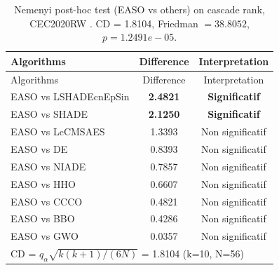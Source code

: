\begin{center}
\small
\renewcommand{\arraystretch}{1.25}
\begin{longtable}{lcc}
\caption{Nemenyi post-hoc test (EASO vs others) on cascade rank, CEC2020RW . CD = 1.8104, Friedman $=38.8052$, $p=1.2491e-05$.}
\label{tab:nemenyi_cascade_CEC2020RW} \\
\toprule
Algorithms & Difference & Interpretation \\
\midrule
\endfirsthead
\toprule
Algorithms & Difference & Interpretation \\
\midrule
\endhead
EASO vs LSHADEcnEpSin & \textbf{2.4821} & \textbf{Significatif} \\
EASO vs SHADE & \textbf{2.1250} & \textbf{Significatif} \\
EASO vs LcCMSAES & 1.3393 & Non significatif \\
EASO vs DE & 0.8393 & Non significatif \\
EASO vs NIADE & 0.7857 & Non significatif \\
EASO vs HHO & 0.6607 & Non significatif \\
EASO vs CCCO & 0.4821 & Non significatif \\
EASO vs BBO & 0.4286 & Non significatif \\
EASO vs GWO & 0.0357 & Non significatif \\
\midrule
\multicolumn{3}{l}{CD = $q_\alpha \sqrt{k(k+1)/(6N)}$ = 1.8104 (k=10, N=56)} \\
\bottomrule
\end{longtable}
\end{center}